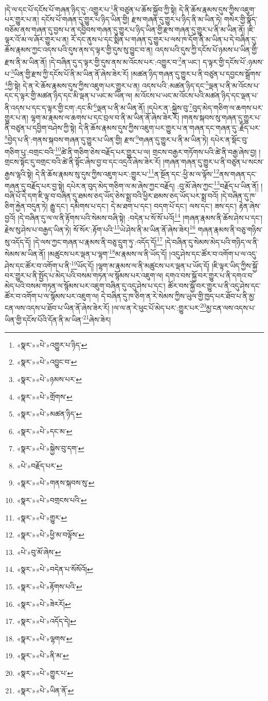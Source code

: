 །དེ་ལ་དང་པོ་དངོས་པོ་གཞན་ཉིད་དུ་:འགྱུར་པ་\footnote{«སྣར་»«པེ་»འགྱུར་པ་ཉིད་}ནི་བཙུན་པ་ཆོས་སྐྱོབ་ཀྱི་སྟེ། དེ་ནི་ཆོས་རྣམས་དུས་ཀྱིས་འཇུག་པར་གྱུར་པ་ན། དངོས་པོ་གཞན་དུ་གྱུར་པ་ཉིད་ཡིན་གྱི། རྫས་གཞན་དུ་གྱུར་པ་ཉིད་ནི་མ་ཡིན་ཏེ། གསེར་གྱི་སྣོད་བཅོམ་ནས་གཞན་དུ་བྱས་པ་ན་དབྱིབས་གཞན་དུ་གྱུར་པ་ཉིད་ཡིན་གྱི་རྫས་གཞན་དུ་གྱུར་པ་ནི་མ་ཡིན་ནོ། །ཇི་ལྟར་འོ་མ་ལ་ཞོར་གྱུར་པ་ན། རོ་དང་ནུས་པ་དང་སྨིན་པ་གཞན་དུ་གྱུར་པ་ལས་ཁ་དོག་ནི་མ་ཡིན་པ་དེ་བཞིན་དུ་ཆོས་རྣམས་ཀྱང་འདས་པའི་དུས་ནས་ད་ལྟར་གྱི་དུས་སུ་བྱུང་བ་ན། འདས་པའི་དུས་ཀྱི་དངོས་པོ་ཉམས་པ་ཡིན་གྱི་རྫས་ནི་མ་ཡིན་ནོ། །དེ་བཞིན་དུ་ད་ལྟར་གྱི་དུས་ནས་མ་འོངས་པར་:འགྱུར་བ་\footnote{«སྣར་»«པེ་»འབྱུང་བ་}ན་ཡང་། ད་ལྟར་གྱི་དངོས་པོ་:ཉམས་པ་\footnote{«སྣར་»«པེ་»ཉམས་པར་}ཡིན་གྱི་རྫས་ཀྱི་དངོས་པོ་ནི་མ་ཡིན་ནོ་ཞེས་ཟེར་རོ། །མཚན་ཉིད་གཞན་དུ་གྱུར་པ་ནི་བཙུན་པ་དབྱངས་སྒྲོགས་\footnote{«སྣར་»«པེ་»གྲོགས་}ཀྱི་སྟེ། དེ་ན་རེ་ཆོས་རྣམས་དུས་ཀྱིས་འཇུག་པར་གྱུར་པ་ན། འདས་པའི་:མཚན་ཉིད་དང་\footnote{«སྣར་»«པེ་»མཚན་ཉིད་}ལྡན་པ་ནི་མ་འོངས་པ་དང་ད་ལྟར་གྱི་མཚན་ཉིད་དང་མི་ལྡན་པ་ཡང་མ་ཡིན་ལ། མ་འོངས་པ་ཡང་མ་འོངས་པའི་མཚན་ཉིད་དང་ལྡན་པ་ནི་འདས་པ་དང་ད་ལྟར་གྱི་ངག་:དང་མི་\footnote{«སྣར་»«པེ་»དང་མ་}ལྡན་པ་ནི་མ་ཡིན་ནོ། །དཔེར་ན་:སྐྱེས་བུ་\footnote{«སྣར་»«པེ་»སྐྱེས་བུ་དག་}བུད་མེད་གཅིག་ལ་ཆགས་པར་གྱུར་པ་ན། ལྷག་མ་རྣམས་ལ་ཆགས་པ་དང་བྲལ་བ་ནི་མ་ཡིན་ནོ་ཞེས་ཟེར་རོ། །གནས་སྐབས་སུ་གཞན་དུ་གྱུར་པ་ནི་བཙུན་པ་དབྱིག་བཤེས་ཀྱི་སྟེ། དེ་ནི་ཆོས་རྣམས་དུས་ཀྱིས་འཇུག་པར་གྱུར་པ་ན་གཞན་དང་གཞན་དུ་:རྗོད་པར་\footnote{«པེ་»བརྗོད་པར་}བྱེད་པ་ནི་:གནས་སྐབས་གཞན་དུ་གྱུར་པ་ཡིན་གྱི། རྫས་\footnote{«སྣར་»«པེ་»གནས་སྐབས་སུ་}གཞན་དུ་གྱུར་པ་ནི་མ་ཡིན་ཏེ། དཔེར་ན་སྡོང་བུ་གཅིག་པུ་:བགྲང་བའི་\footnote{«སྣར་»«པེ་»བགྲངས་པའི་}ཚེ་ནི་གཅིག་ཅེས་བརྗོད་པར་གྱུར་པ་ལ། གྲངས་བརྒྱར་གཏོགས་པའི་ཚེ་ནི་བརྒྱ་ཞེས་བྱ། །གྲངས་སྟོང་དུ་བགྲང་བའི་ཚེ་ནི་སྟོང་ཞེས་བྱ་བ་དང་འདྲའོ་ཞེས་ཟེར་རོ། །གཞན་གཞན་དུ་གྱུར་པ་ནི་བཙུན་པ་སངས་རྒྱས་ལྷའི་སྟེ། དེ་ནི་ཆོས་རྣམས་སུ་དུས་ཀྱིས་འཇུག་པར་:གྱུར་པ་\footnote{«སྣར་»«པེ་»གྱུར་}ན་སྔོན་དང་:ཕྱི་མ་ལ་ལྟོས་\footnote{«སྣར་»«པེ་»ཕྱི་མ་བལྟོས་}ནས་གཞན་དང་གཞན་དུ་བརྗོད་པར་བྱ་སྟེ། དཔེར་ན་བུད་མེད་གཅིག་ལ་མ་ཞེས་ཀྱང་བརྗོད། :བུ་མོ་ཞེས་ཀྱང་\footnote{«པེ་»བུ་མོ་ཞེས་}བརྗོད་པ་ཡིན་ནོ། །བཞི་པོ་དེ་དག་ཇི་ལྟ་བ་བཞིན་དུ་ཐམས་ཅད་ཡོད་ཅེས་སྨྲ་བའི་ཕྱིར་ཐམས་ཅད་ཡོད་པར་སྨྲ་བའོ། །དེ་བཞིན་དུ་ཁ་ཅིག་རྐྱེན་བདུན་ཏེ། རྒྱུ་དང་། དམིགས་པ་དང་། དེ་མ་ཐག་པ་དང་། བདག་པོ་དང་། ལས་དང་། ཟས་དང་། རྟེན་ཞེས་བྱའོ། །དེ་བཞིན་དུ་ལ་ལ་ནི་རྟོགས་པའི་སེམས་བཞི་སྟེ། :བདེན་པ་སོ་སོ་པའོ།\footnote{«སྣར་»«པེ་»བདེན་པ་སོསོའོ།} །གཞན་རྣམས་ནི་ཆོས་ཤེས་པ་དང་། རྗེས་སུ་ཤེས་པ་བརྒྱད་ཡིན་ཏེ། སོ་སོར་:རྟོག་པའི་\footnote{«སྣར་»«པེ་»རྟོགས་པའི་}ཡེ་ཤེས་ནི་མ་ཡིན་ནོ་ཞེས་ཟེར།\footnote{«སྣར་»«པེ་»ཟེརརོ།} གཞན་རྣམས་ནི་བཅུ་གཉིས་སུ་འདོད་དོ། །དེ་ལས་ཀྱང་གཞན་པ་རྣམས་ནི་བཅུ་དྲུག་ཏུ་:འདོད་དོ།\footnote{«སྣར་»«པེ་»འདོད་དེ།} །དེ་བཞིན་དུ་སེམས་མེད་པའི་གཉིད་ལ་ནི་སེམས་མ་ཡིན་ནོ། །མཚུངས་པར་ལྡན་པ་ལྷག་\footnote{«སྣར་»«པེ་»ལྷགས་}མ་རྣམས་ལ་ནི་ཡོད་དོ། །འདུ་ཤེས་དང་ཚོར་བ་འགོག་པ་ལ་འདུ་ཤེས་དང་ཚོར་བ་འགོག་པ་ནི་\footnote{«སྣར་»«པེ་»ནི་མ་}ཡོད་དོ། །ལྷག་མ་རྣམས་ལ་ནི་མཚུངས་པར་ལྡན་པ་ཡོད་དོ། །ཇི་ལྟར་ཡིད་ཀྱིས་སྐྱོ་བར་གྱུར་པ་ནི་སྤྱོད་པ་མེད་པའི་བསམ་གཏན་ལ་སྙོམས་པར་འཇུག་ལ། དགའ་བས་སྐྱོ་བར་གྱུར་པ་ནི་དགའ་བ་མེད་པའི་བསམ་གཏན་ལ་སྙོམས་པར་འཇུག་བཞིན་དུ་འདུ་ཤེས་པ་དང་། ཚོར་བས་སྐྱོ་བར་གྱུར་པ་ནི་འདུ་ཤེས་དང་ཚོར་བ་འགོག་པ་ལ་སྙོམས་པར་འཇུག་ལ། དེ་བཞིན་དུ་ཁ་ཅིག་ན་རེ་སེམས་ཀྱིས་ཡུལ་གྱི་ཁྱད་པར་ཐོབ་པ་ནི་མྱ་ངན་ལས་འདས་པ་ཐོབ་པ་ཡིན་ནོ་ཞེས་ཟེར་རོ། །ལ་ལ་ན་རེ་ཕུང་པོ་མེད་པར་:གྱུར་པར་\footnote{«སྣར་»«པེ་»གྱུར་པ་}མྱ་ངན་ལས་འདས་པ་ཡིན་གྱི་དངོས་པོའི་དོན་ནི་མ་ཡིན་\footnote{«སྣར་»«པེ་»ཡིན་ནོ་}ཞེས་ཟེར། 